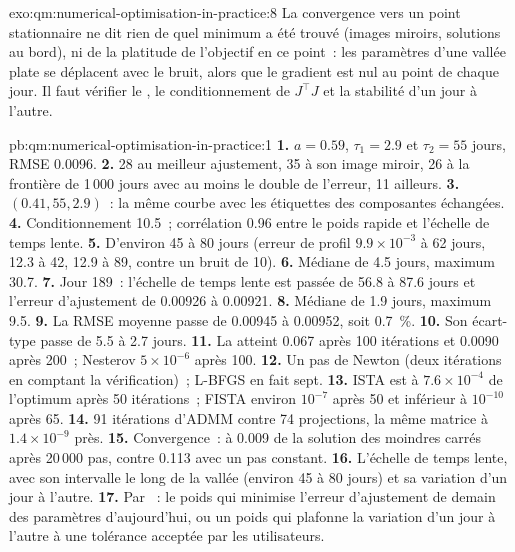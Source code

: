 \begin{solution}{exo:qm:numerical-optimisation-in-practice:8}
La convergence vers un point stationnaire ne dit rien de quel minimum a été trouvé (images miroirs, solutions au bord), ni de la platitude de l'objectif en ce point~: les paramètres d'une vallée plate se déplacent
avec le bruit, alors que le gradient est nul au point de chaque jour. Il faut vérifier le , le conditionnement de $J^\top J$ et la stabilité d'un jour à l'autre.
\end{solution}

\begin{solution}{pb:qm:numerical-optimisation-in-practice:1}
\textbf{1.} $a = 0.59$, $\tau_1 = 2.9$ et $\tau_2 = 55$ jours, RMSE 0.0096.
\textbf{2.} 28 au meilleur ajustement, 35 à son image miroir, 26 à la frontière de 1\,000 jours avec au moins le double de l'erreur, 11 ailleurs.
\textbf{3.} $(0.41, 55, 2.9)$~: la même courbe avec les étiquettes des composantes échangées.
\textbf{4.} Conditionnement 10.5~; corrélation 0.96 entre le poids rapide et l'échelle de temps lente.
\textbf{5.} D'environ 45 à 80 jours (erreur de profil $9.9 \times 10^{-3}$ à 62 jours, 12.3 à 42, 12.9 à 89, contre un bruit de 10).
\textbf{6.} Médiane de 4.5 jours, maximum 30.7.
\textbf{7.} Jour 189~: l'échelle de temps lente est passée de 56.8 à 87.6 jours et l'erreur d'ajustement de 0.00926 à 0.00921.
\textbf{8.} Médiane de 1.9 jours, maximum 9.5.
\textbf{9.} La RMSE moyenne passe de 0.00945 à 0.00952, soit 0.7~\%.
\textbf{10.} Son écart-type passe de 5.5 à 2.7 jours.
\textbf{11.} La  atteint 0.067 après 100 itérations et 0.0090 après 200~; Nesterov $5 \times 10^{-6}$ après 100.
\textbf{12.} Un pas de Newton (deux itérations en comptant la vérification)~; L-BFGS en fait sept.
\textbf{13.} ISTA est à $7.6 \times 10^{-4}$ de l'optimum après 50 itérations~; FISTA environ $10^{-7}$ après 50 et inférieur à $10^{-10}$ après 65.
\textbf{14.} 91 itérations d'ADMM contre 74 projections, la même matrice à $1.4 \times 10^{-9}$ près.
\textbf{15.} Convergence~: à 0.009 de la solution des moindres carrés après 20\,000 pas, contre 0.113 avec un pas constant.
\textbf{16.} L'échelle de temps lente, avec son intervalle le long de la vallée (environ 45 à 80 jours) et sa variation d'un jour à l'autre.
\textbf{17.} Par ~: le poids qui minimise l'erreur d'ajustement de demain des paramètres d'aujourd'hui, ou un poids qui plafonne la variation d'un jour à l'autre à une tolérance acceptée par les utilisateurs.

\end{solution}

